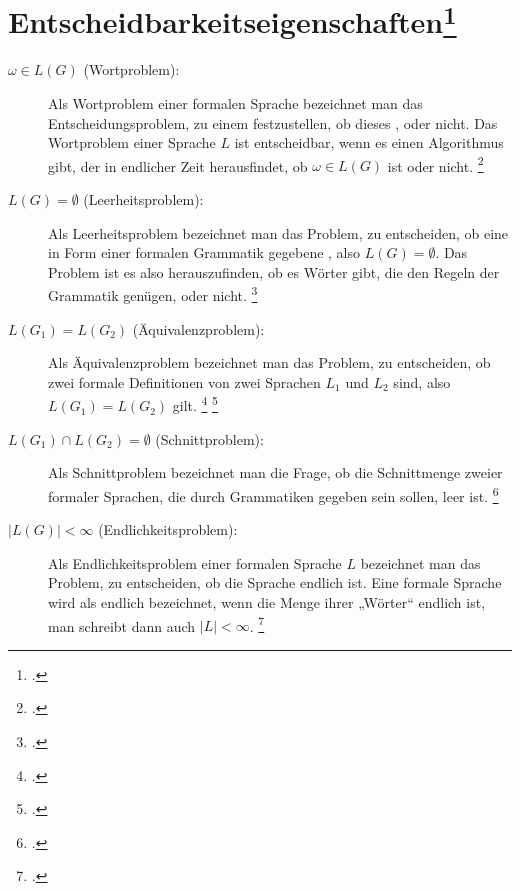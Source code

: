 \documentclass{lehramt-informatik-haupt}
\begin{document}
\section{Entscheidbarkeitseigenschaften\footcite[Seite 591 Kapitel 19.1.3.3]{schneider}}

\begin{description}

%

\item[$\omega \in L(G)$ (Wortproblem):]

Als Wortproblem einer formalen Sprache bezeichnet man das
Entscheidungsproblem, zu einem  festzustellen, ob
dieses , oder nicht. Das Wortproblem einer
Sprache $L$ ist entscheidbar, wenn es einen Algorithmus gibt, der in
endlicher Zeit herausfindet, ob $\omega \in L(G)$ ist oder nicht.
\footcite{wiki:wortproblem}

%

\item[$L(G) = \emptyset$ (Leerheitsproblem):]

Als Leerheitsproblem bezeichnet man das Problem, zu entscheiden, ob eine
in Form einer formalen Grammatik gegebene , also $L(G) = \emptyset$. Das Problem ist es also
herauszufinden, ob es Wörter gibt, die den Regeln der Grammatik genügen,
oder nicht.
\footcite{wiki:leerheitsproblem}

%

\item[$L(G_1) = L(G_2)$ (Äquivalenzproblem):]

Als Äquivalenzproblem bezeichnet man das Problem, zu entscheiden, ob
zwei formale Definitionen von zwei Sprachen $L_1$ und $L_2$
 sind, also $L(G_1) = L(G_2)$ gilt.
\footcite[Seite 70-71]{theo:fs:1}
\footcite{wiki:aequivalenzproblem}

%

\item[$L(G_1) \cap L(G_2) = \emptyset$ (Schnittproblem):]

Als Schnittproblem bezeichnet man die Frage, ob die Schnittmenge zweier
formaler Sprachen, die durch Grammatiken gegeben sein sollen, leer ist.
\footcite{wiki:schnittproblem}

%

\item[$|L(G)| < \infty$ (Endlichkeitsproblem):]

Als Endlichkeitsproblem einer formalen Sprache $L$ bezeichnet man das
Problem, zu entscheiden, ob die Sprache endlich ist. Eine formale
Sprache wird als endlich bezeichnet, wenn die Menge ihrer
„Wörter“ endlich ist, man schreibt dann auch $|L| < \infty$.
\footcite{wiki:endlichkeitsproblem}
\end{description}
\end{document}
